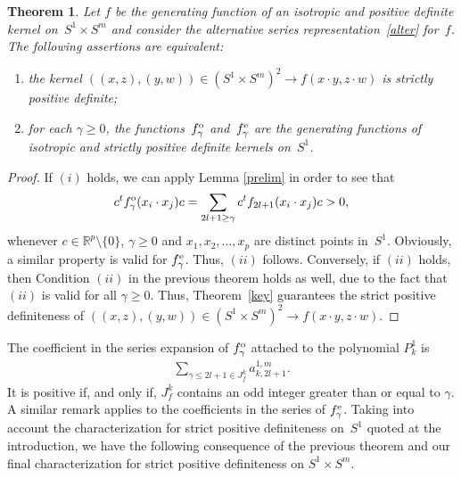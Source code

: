 \documentclass[pdftex]{sigma}
\numberwithin{equation}{section}
\newtheorem{Theorem}{Theorem}[section]
\begin{document}
\begin{Theorem}
Let $f$ be the generating function of an isotropic and positive definite kernel on~\mbox{$S^1 \times S^m$} and consider the alternative series representation~\eqref{alter} for~$f$. The following assertions are equivalent:
\begin{enumerate}\itemsep=0pt
\item[$(i)$] the kernel $((x,z), (y,w)) \in (S^1 \times S^m)^2 \to f(x \cdot y, z \cdot w)$ is strictly positive definite;
\item[$(ii)$] for each $\gamma \geq 0$, the functions~$f_\gamma^{\rm o}$ and~$f_{\gamma}^{\rm e}$ are the generating functions of isotropic and strictly positive definite kernels on~$S^1$.
\end{enumerate}
\end{Theorem}
\begin{proof} If $(i)$ holds, we can apply Lemma \ref{prelim} in order to see that
\begin{gather*}c^t f_\gamma^{\rm o}(x_i \cdot x_j)c =\sum_{2l+1\geq \gamma} c^t f_{2l+1}(x_i \cdot x_j)c >0,\end{gather*}
whenever $c \in \mathbb{R}^p\setminus\{0\}$, $\gamma \geq 0$ and $x_1, x_2, \ldots, x_p$ are distinct points in~$S^1$. Obviously, a similar property is valid for
$f_\gamma^{\rm e}$. Thus, $(ii)$ follows. Conversely, if $(ii)$ holds, then Condition $(ii)$ in the previous theorem holds as well, due to the fact that $(ii)$ is valid for all $\gamma\geq 0$. Thus, Theo\-rem~\ref{key} guarantees the strict positive def\/initeness of $((x,z), (y,w)) \in (S^1 \times S^m)^2 \to f(x \cdot y, z \cdot w)$.
\end{proof}

The coef\/f\/icient in the series expansion of $f_\gamma^{\rm o}$ attached to the polynomial $P_k^1$ is
\begin{gather*}\sum_{\gamma \leq 2l+1 \in J_f^k} a_{k,2l+1}^{1,m}.\end{gather*}
It is positive if, and only if, $J_f^k$ contains an odd integer greater than or equal to $\gamma$. A similar remark applies to the coef\/f\/icients in the series of $f_\gamma^{\rm e}$. Taking into account the characterization for strict positive def\/initeness on~$S^1$ quoted at the introduction, we have the following consequence of the previous theorem and our f\/inal characterization for strict positive def\/initeness on $S^1 \times S^m$.
\end{document}
